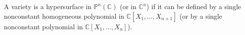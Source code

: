A variety is a hypersurface in $\mathbb{P}^n(\mathbb{C})$ (or in $\mathbb{C}^n$) if it can be defined by a single nonconstant homogeneous polynomial in $\mathbb{C}[X_1, \ldots, X_{n+1}]$ (or by a single nonconstant polynomial in $\mathbb{C}[X_1, \ldots, X_n]$).
